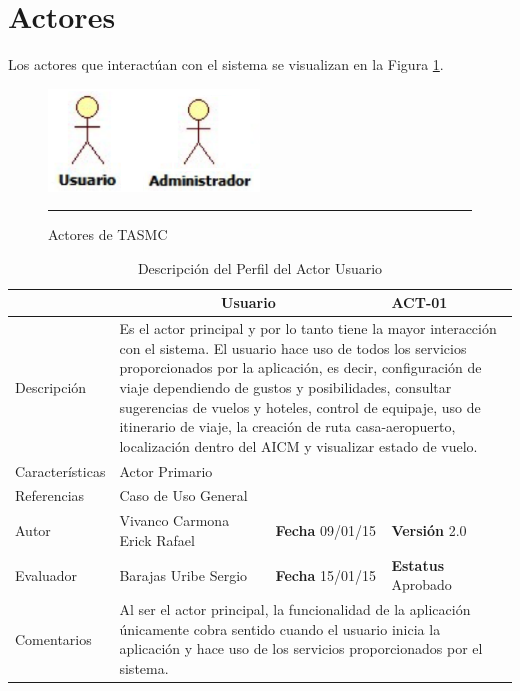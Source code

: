 \section{Actores}

Los actores que interactúan con el sistema se visualizan en la Figura \ref{fig:actoresTASMC}.
\begin{figure}[htbp]
	\centering
		\includegraphics[width=0.5\textwidth]{Figuras/actores.png}
		\rule{30em}{0.5pt}
	\caption[Actores de TASMC]{Actores de TASMC}
	\label{fig:actoresTASMC}
\end{figure}
\clearpage

\begin{table}[htbp]
	\begin{center}
		\begin{tabular}{|p{2.5cm}|p{6.4cm}|p{2cm}|p{2cm}|}
			\hline
				\rowcolor[RGB]{51,153,255}{Actor}&\multicolumn{2}{c}{Usuario}&{\textbf{ACT-01}}\\
			\hline
				{Descripción}&\multicolumn{3}{p{11.2cm}|}{
			Es el actor principal y por lo tanto tiene la mayor interacción con el sistema. El usuario hace uso de todos 				los servicios proporcionados por la aplicación, es decir, configuración de viaje dependiendo de gustos y 					posibilidades, consultar sugerencias de vuelos y hoteles, control de equipaje, uso de itinerario de viaje, la 				creación de ruta casa-aeropuerto, localización dentro del AICM y visualizar estado de vuelo.}\\
			\hline
				{Características}&\multicolumn{3}{p{11.2cm}|}{Actor Primario}\\
			\hline
				{Referencias}&\multicolumn{3}{p{11.2cm}|}{Caso de Uso General}\\
			\hline
				{Autor}&{Vivanco Carmona Erick Rafael}&{\textbf{Fecha} 09/01/15}&{\textbf{Versión} 2.0}\\
			\hline
				{Evaluador}&{Barajas Uribe Sergio}&{\textbf{Fecha} 15/01/15}&{\textbf{Estatus} Aprobado}\\
			\hline
				{Comentarios}&\multicolumn{3}{p{11.2cm}|}{Al ser el actor principal, la funcionalidad de la aplicación 						únicamente cobra sentido cuando el usuario inicia la aplicación y hace uso de los servicios 										proporcionados por el sistema.}\\
			\hline
		\end{tabular}
	\end{center}
	\caption[Descripción del Perfil del Actor Usuario]{Descripción del Perfil del Actor Usuario}
    	\label{tab:perfilUsuario}
\end{table}

